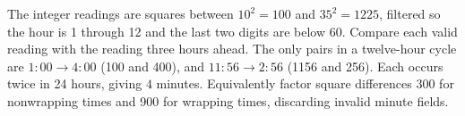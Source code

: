 The integer readings are squares between $10^2=100$ and $35^2=1225$, filtered so the hour is 1 through 12 and the last two digits are below 60. Compare each valid reading with the reading three hours ahead. The only pairs in a twelve-hour cycle are $1{:}00\to4{:}00$ (100 and 400), and $11{:}56\to2{:}56$ (1156 and 256). Each occurs twice in 24 hours, giving $\boxed{4}$ minutes. Equivalently factor square differences 300 for nonwrapping times and 900 for wrapping times, discarding invalid minute fields.
